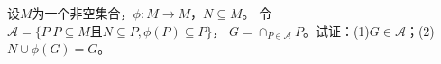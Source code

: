 \begin{Exercise}
  设$M$为一个非空集合，$\phi:M \to M$，$N\subseteq M$。
  令$\mathscr{A}=\{P|P\subseteq M \text{且} N\subseteq P,\phi(P)  \subseteq P\}$，
  $G=\cap_{P\in \mathscr{A}}P$。试证：(1)$G\in \mathscr{A}$；(2)$N\cup \phi(G) = G$。
\end{Exercise}
